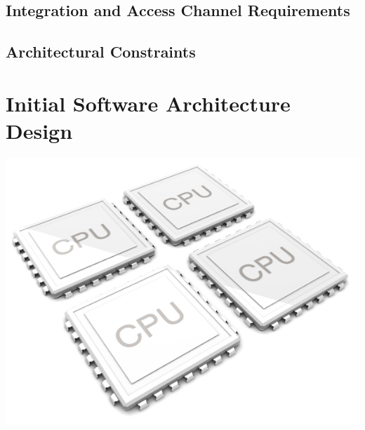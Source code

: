 \documentclass[a4paper,12pt]{article}
\begin{document}
\subsection{Integration and Access Channel Requirements}
\subsection{Architectural Constraints}
\section{Initial Software Architecture Design}
\includegraphics[width=\textwidth]{2012-quad-core-phones.jpg}
\end{document}
